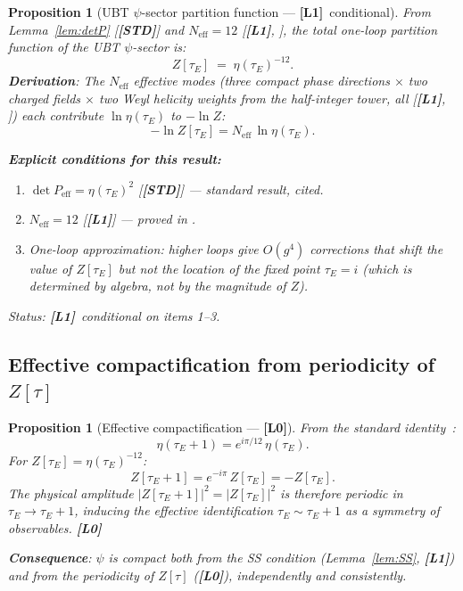 \documentclass[12pt,a4paper]{article}
\newtheorem{proposition}[theorem]{Proposition}
\theoremstyle{definition}\newtheorem{definition}[theorem]{Definition}
\theoremstyle{remark}\newtheorem{remark}[theorem]{Remark}
\newcommand{\Lz}{\textbf{[L0]}}
\newcommand{\Lo}{\textbf{[L1]}}
\newcommand{\STD}{\textbf{[STD]}}
\begin{document}
\begin{proposition}[UBT $\psi$-sector partition function — \Lo\ conditional]
\label{prop:Z}
From Lemma~\ref{lem:detP} [\STD] and $N_{\mathrm{eff}}=12$ [\Lo,
\textup{\cite{su2_twist}}], the total one-loop partition function
of the UBT $\psi$-sector is:
\[
  \boxed{Z[\tau_E] \;=\; \eta(\tau_E)^{-12}.}
\]
\textbf{Derivation}: The $N_{\mathrm{eff}}$ effective modes (three
compact phase directions $\times$ two charged fields $\times$ two
Weyl helicity weights from the half-integer tower, all [\Lo,
\cite{su2_twist}]) each contribute $\ln\eta(\tau_E)$ to $-\ln Z$:
\[
  -\ln Z[\tau_E] = N_{\mathrm{eff}}\,\ln\eta(\tau_E).
\]

\textbf{Explicit conditions for this result:}
\begin{enumerate}
\item $\det P_{\mathrm{eff}} = \eta(\tau_E)^2$ [\STD] — standard
  result, cited.
\item $N_{\mathrm{eff}} = 12$ [\Lo] — proved in \cite{su2_twist}.
\item One-loop approximation: higher loops give $O(g^4)$ corrections
  that shift the value of $Z[\tau_E]$ but not the \emph{location} of
  the fixed point $\tau_E=i$ (which is determined by algebra, not by
  the magnitude of $Z$).
\end{enumerate}
Status: \Lo\ conditional on items 1--3.
\end{proposition}

\subsection{Effective compactification from periodicity of $Z[\tau]$}

\begin{proposition}[Effective compactification — \Lz]
\label{prop:compact}
From the standard identity~\cite[§9.2]{apostol_modular}:
\[
  \eta(\tau_E + 1) = e^{i\pi/12}\,\eta(\tau_E).
\]
For $Z[\tau_E] = \eta(\tau_E)^{-12}$:
\[
  Z[\tau_E + 1] = e^{-i\pi}\,Z[\tau_E] = -Z[\tau_E].
\]
The physical amplitude $|Z[\tau_E+1]|^2 = |Z[\tau_E]|^2$ is
therefore periodic in $\tau_E \to \tau_E + 1$, inducing the
effective identification $\tau_E \sim \tau_E + 1$ as a symmetry of
observables. \Lz

\textbf{Consequence}: $\psi$ is compact both from the SS condition
(Lemma~\ref{lem:SS}, \Lo) and from the periodicity of $Z[\tau]$
(\Lz), independently and consistently.
\end{proposition}
\end{document}
